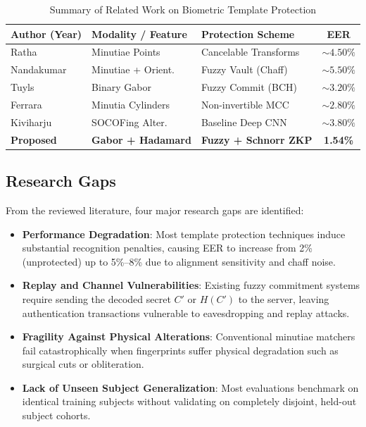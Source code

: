 \documentclass[conference]{IEEEtran}
\begin{document}
\begin{table}[!t]
\centering
\caption{Summary of Related Work on Biometric Template Protection}
\label{tab:litreview}
\setlength{\tabcolsep}{2.5pt}
\renewcommand{\arraystretch}{1.08}
\footnotesize
\begin{tabular}{p{1.6cm} p{1.9cm} p{2.1cm} c}
\toprule
\textbf{Author (Year)} & \textbf{Modality / Feature} & \textbf{Protection Scheme} & \textbf{EER} \\
\midrule
Ratha \cite{ratha2007cancelable} & Minutiae Points & Cancelable Transforms & $\sim 4.50\%$ \\
Nandakumar \cite{nandakumar2007vault} & Minutiae + Orient. & Fuzzy Vault (Chaff) & $\sim 5.50\%$ \\
Tuyls \cite{tuyls2005practical} & Binary Gabor & Fuzzy Commit (BCH) & $\sim 3.20\%$ \\
Ferrara \cite{ferrara2012mcc} & Minutia Cylinders & Non-invertible MCC & $\sim 2.80\%$ \\
Kiviharju \cite{socofing2018} & SOCOFing Alter. & Baseline Deep CNN & $\sim 3.80\%$ \\
\textbf{Proposed} & \textbf{Gabor + Hadamard} & \textbf{Fuzzy + Schnorr ZKP} & \textbf{1.54\%} \\
\bottomrule
\end{tabular}
\end{table}

\subsection{Research Gaps}
From the reviewed literature, four major research gaps are identified:
\begin{itemize}[leftmargin=*, itemsep=2pt]
    \item \textbf{Performance Degradation}: Most template protection techniques induce substantial recognition penalties, causing EER to increase from 2\% (unprotected) up to 5\%--8\% due to alignment sensitivity and chaff noise.
    \item \textbf{Replay and Channel Vulnerabilities}: Existing fuzzy commitment systems require sending the decoded secret $C'$ or $H(C')$ to the server, leaving authentication transactions vulnerable to eavesdropping and replay attacks.
    \item \textbf{Fragility Against Physical Alterations}: Conventional minutiae matchers fail catastrophically when fingerprints suffer physical degradation such as surgical cuts or obliteration.
    \item \textbf{Lack of Unseen Subject Generalization}: Most evaluations benchmark on identical training subjects without validating on completely disjoint, held-out subject cohorts.
\end{itemize}
\end{document}
